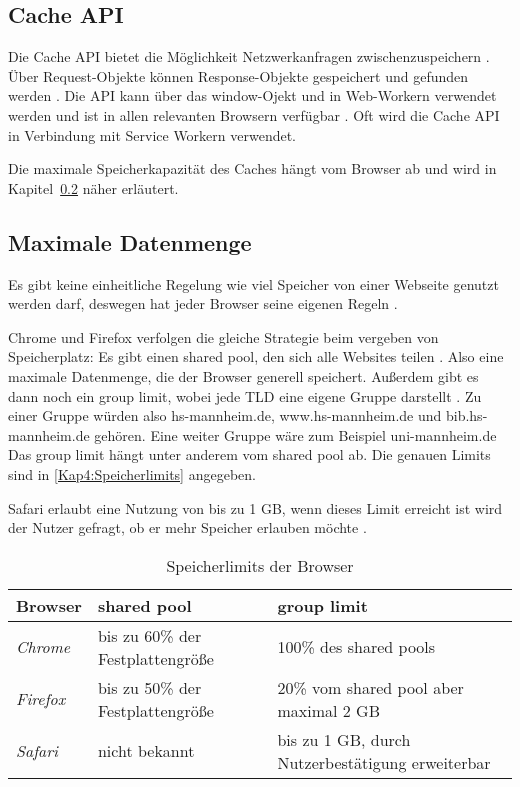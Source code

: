\subsection{Cache API}
Die Cache \ac{API} bietet die Möglichkeit Netzwerkanfragen zwischenzuspeichern \autocite{mdn-cache-api}. Über Request-Objekte können Response-Objekte gespeichert und gefunden werden \autocite{mdn-cache-api}. Die \ac{API} kann über das window-Ojekt und in Web-Workern verwendet werden und ist in allen relevanten Browsern verfügbar \autocite{mdn-cache-api}. Oft wird die Cache \ac{API} in Verbindung mit Service Workern verwendet.

Die maximale Speicherkapazität des Caches hängt vom Browser ab und wird in Kapitel~\ref{Kap4:Datenmenge} näher erläutert. 

\subsection{Maximale Datenmenge}
\label{Kap4:Datenmenge}
Es gibt keine einheitliche Regelung wie viel Speicher von einer Webseite genutzt werden darf, deswegen hat jeder Browser seine eigenen Regeln \autocite{storage-for-the-web}. 

Chrome und Firefox verfolgen die gleiche Strategie beim vergeben von Speicherplatz: Es gibt einen shared pool, den sich alle Websites teilen \autocite{storage-for-the-web} \autocite{mdn-browser-storage-limit}. Also eine maximale Datenmenge, die der Browser generell speichert. Außerdem gibt es dann noch ein group limit, wobei jede \ac{TLD} eine eigene Gruppe darstellt \autocite{mdn-browser-storage-limit}. Zu einer Gruppe würden also hs-mannheim.de, www.hs-mannheim.de und bib.hs-mannheim.de gehören. Eine weiter Gruppe wäre zum Beispiel uni-mannheim.de Das group limit hängt unter anderem vom shared pool ab. Die genauen Limits sind in \autoref{Kap4:Speicherlimits} angegeben.

Safari erlaubt eine Nutzung von bis zu 1 \ac{GB}, wenn dieses Limit erreicht ist wird der Nutzer gefragt, ob er mehr Speicher erlauben möchte \autocite{storage-for-the-web}. 

\begin{table}
  \renewcommand{\arraystretch}{1.2}
  \centering
  \sffamily
  \begin{footnotesize}
    \begin{tabular}{l l l}
      \toprule
      \textbf{Browser} & \textbf{shared pool} & \textbf{group limit} \\
      \midrule
      \emph{Chrome} & bis zu 60\% der Festplattengröße & 100\% des shared pools \\
      \emph{Firefox} & bis zu 50\% der Festplattengröße & 20\% vom shared pool aber maximal 2 \ac{GB} \\
      \emph{Safari} & nicht bekannt & bis zu 1 \ac{GB}, durch Nutzerbestätigung erweiterbar \\
      \bottomrule
    \end{tabular}
  \end{footnotesize}
  \rmfamily
  \caption{Speicherlimits der Browser}
  \label{Kap4:Speicherlimits}
\end{table}

